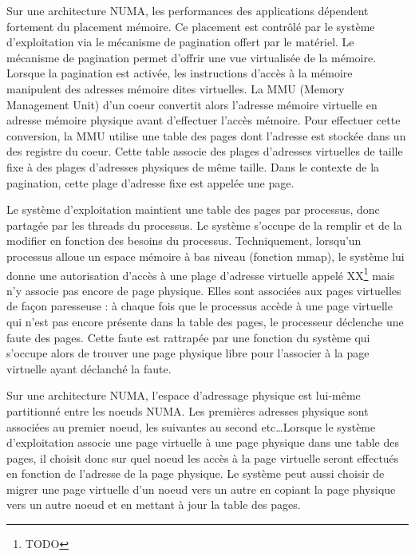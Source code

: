       Sur une architecture NUMA, les performances des applications dépendent
      fortement du placement mémoire. Ce placement est contrôlé par le système
      d'exploitation via le mécanisme de pagination offert par le matériel. Le
      mécanisme de pagination permet d'offrir une vue virtualisée de la
      mémoire. Lorsque la pagination est activée, les instructions d'accès à la
      mémoire manipulent des adresses mémoire dites virtuelles. La MMU (Memory
      Management Unit) d'un coeur convertit alors l'adresse mémoire virtuelle en
      adresse mémoire physique avant d'effectuer l'accès mémoire. Pour effectuer
      cette conversion, la MMU utilise une table des pages dont l'adresse est
      stockée dans un des registre du coeur. Cette table associe des plages
      d'adresses virtuelles de taille fixe à des plages d'adresses physiques de
      même taille. Dans le contexte de la pagination, cette plage d'adresse fixe
      est appelée une page.

      Le système d'exploitation maintient une table des pages par processus,
      donc partagée par les threads du processus. Le système s'occupe de la
      remplir et de la modifier en fonction des besoins du
      processus. Techniquement, lorsqu'un processus alloue un espace mémoire à
      bas niveau (fonction mmap), le système lui donne une autorisation d'accès
      à une plage d'adresse virtuelle appelé XX\footnote{TODO} mais n'y associe
      pas encore de page physique. Elles sont associées aux pages virtuelles de
      façon paresseuse : à chaque fois que le processus accède à une page
      virtuelle qui n'est pas encore présente dans la table des pages, le
      processeur déclenche une faute des pages. Cette faute est rattrapée par
      une fonction du système qui s'occupe alors de trouver une page physique
      libre pour l'associer à la page virtuelle ayant déclanché la faute.
      
      Sur une architecture NUMA, l'espace d'adressage physique est lui-même
      partitionné entre les noeuds NUMA. Les premières adresses physique sont
      associées au premier noeud, les suivantes au second etc\ldots Lorsque le
      système d'exploitation associe une page virtuelle à une page physique dans
      une table des pages, il choisit donc sur quel noeud les accès à la page
      virtuelle seront effectués en fonction de l'adresse de la page
      physique. Le système peut aussi choisir de migrer une page virtuelle d'un
      noeud vers un autre en copiant la page physique vers un autre noeud et en
      mettant à jour la table des pages.


